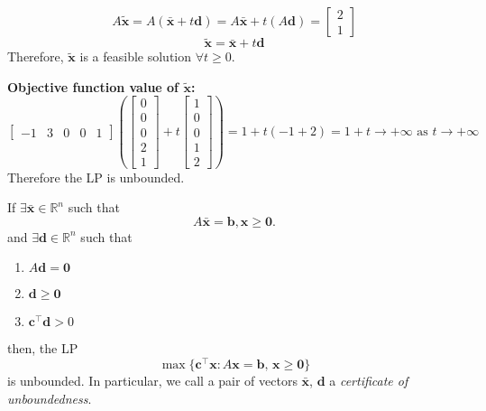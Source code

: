 \begin{exbox}
\begin{example}[Unbounded LP]
        \[A\tilde{\bm{x}}=A(\bar{\bm{x}}+t\bm{d})=A\bar{\bm{x}}+t(A\bm{d})=
            \begin{bmatrix}
                2 \\
                1
            \end{bmatrix}\]
        \[\tilde{\bm{x}}=\bar{\bm{x}}+t\bm{d}\]
        Therefore, $\tilde{\bm{x}}$ is a feasible solution $\forall t\geqslant  0$.


        \textbf{Objective function value of $\tilde{\bm{x}}$:}
        \[
            \begin{bmatrix}
                -1 & 3 & 0 & 0 & 1
            \end{bmatrix}
            \left(\begin{bmatrix}
                    0 \\
                    0 \\
                    0 \\
                    2 \\
                    1
                \end{bmatrix}
            +
            t
            \begin{bmatrix}
                    1 \\
                    0 \\
                    0 \\
                    1 \\
                    2
                \end{bmatrix}\right)
            =
            1+t(-1+2)=1+t\rightarrow+\infty \text{ as }t\rightarrow+\infty\]
        Therefore the LP is unbounded.
    \end{example}
\end{exbox}

\begin{thmbox}
    \begin{theorem}
        If $\exists \bm{\bar{x}}\in\mathbb{R}^n$ such that
        \[A\bm{\bar{x}}=\bm{b}, \bm{x}\geqslant  \bm{0}.\]
        and $\exists\bm{d}\in\mathbb{R}^n$ such that
        \begin{enumerate}[(1)]
            \item $A\bm{d}=\bm{0}$
            \item $\bm{d}\geqslant  \bm{0}$
            \item $\bm{c}^\top \bm{d}>0$
        \end{enumerate}
        then, the LP
        \[\max \{\bm{c}^\top \bm{x} : A\bm{x}=\bm{b},\,
            \bm{x}\geqslant \bm{0}\}\]
        is unbounded. In particular, we call a pair of vectors $\bm{\bar{x}}$, $\bm{d}$ a
        \emph{certificate of unboundedness}.
    \end{theorem}
\end{thmbox}

